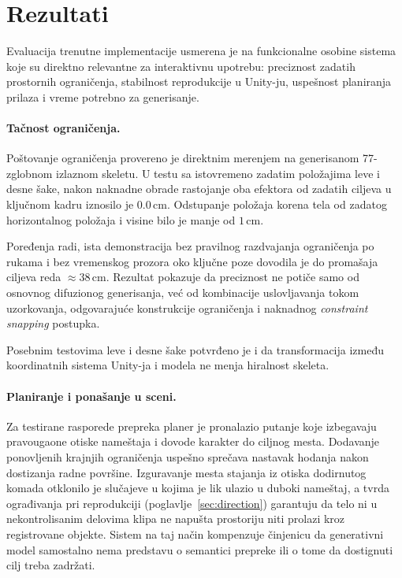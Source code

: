 \documentclass{article}
\begin{document}

\section{Rezultati}
\label{sec:results}

Evaluacija trenutne implementacije usmerena je na funkcionalne osobine sistema koje su direktno relevantne za interaktivnu upotrebu: preciznost zadatih prostornih ograničenja, stabilnost reprodukcije u Unity-ju, uspešnost planiranja prilaza i vreme potrebno za generisanje.

\paragraph{Tačnost ograničenja.}
Poštovanje ograničenja provereno je direktnim merenjem na generisanom 77-zglobnom izlaznom skeletu. U testu sa istovremeno zadatim položajima leve i desne šake, nakon naknadne obrade rastojanje oba efektora od zadatih ciljeva u ključnom kadru iznosilo je $0.0$\,cm. Odstupanje položaja korena tela od zadatog horizontalnog položaja i visine bilo je manje od $1$\,cm.

Poređenja radi, ista demonstracija bez pravilnog razdvajanja ograničenja po rukama i bez vremenskog prozora oko ključne poze dovodila je do promašaja ciljeva reda $\approx38$\,cm. Rezultat pokazuje da preciznost ne potiče samo od osnovnog difuzionog generisanja, već od kombinacije uslovljavanja tokom uzorkovanja, odgovarajuće konstrukcije ograničenja i naknadnog \textit{constraint snapping} postupka.

Posebnim testovima leve i desne šake potvrđeno je i da transformacija između koordinatnih sistema Unity-ja i modela ne menja hiralnost skeleta.

\paragraph{Planiranje i ponašanje u sceni.}
Za testirane rasporede prepreka planer je pronalazio putanje koje izbegavaju pravougaone otiske nameštaja i dovode karakter do ciljnog mesta. Dodavanje ponovljenih krajnjih ograničenja uspešno sprečava nastavak hodanja nakon dostizanja radne površine. Izguravanje mesta stajanja iz otiska dodirnutog komada otklonilo je slučajeve u kojima je lik ulazio u duboki nameštaj, a tvrda ograđivanja pri reprodukciji (poglavlje~\ref{sec:direction}) garantuju da telo ni u nekontrolisanim delovima klipa ne napušta prostoriju niti prolazi kroz registrovane objekte. Sistem na taj način kompenzuje činjenicu da generativni model samostalno nema predstavu o semantici prepreke ili o tome da dostignuti cilj treba zadržati.
\end{document}
